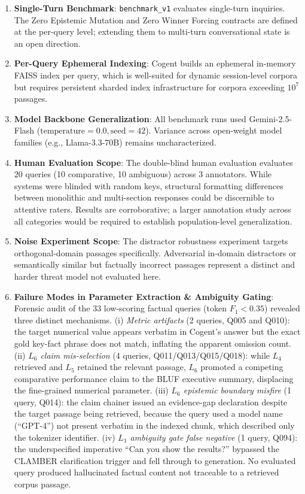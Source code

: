\documentclass[journal,compsoc]{IEEEtran}
\begin{document}
\begin{enumerate}
    \item \textbf{Single-Turn Benchmark}: \texttt{benchmark\_v1} evaluates single-turn inquiries. The Zero Epistemic Mutation and Zero Winner Forcing contracts are defined at the per-query level; extending them to multi-turn conversational state is an open direction.
    \item \textbf{Per-Query Ephemeral Indexing}: Cogent builds an ephemeral in-memory FAISS index per query, which is well-suited for dynamic session-level corpora but requires persistent sharded index infrastructure for corpora exceeding $10^7$ passages.
    \item \textbf{Model Backbone Generalization}: All benchmark runs used Gemini-2.5-Flash ($\text{temperature}=0.0, \text{seed}=42$). Variance across open-weight model families (e.g., Llama-3.3-70B) remains uncharacterized.
    \item \textbf{Human Evaluation Scope}: The double-blind human evaluation evaluates 20 queries (10 comparative, 10 ambiguous) across 3 annotators. While systems were blinded with random keys, structural formatting differences between monolithic and multi-section responses could be discernible to attentive raters. Results are corroborative; a larger annotation study across all categories would be required to establish population-level generalization.
    \item \textbf{Noise Experiment Scope}: The distractor robustness experiment targets orthogonal-domain passages specifically. Adversarial in-domain distractors or semantically similar but factually incorrect passages represent a distinct and harder threat model not evaluated here.
    \item \textbf{Failure Modes in Parameter Extraction \& Ambiguity Gating}: Forensic audit of the 33 low-scoring factual queries (token $F_1 < 0.35$) revealed three distinct mechanisms. (i) \emph{Metric artifacts} (2 queries, Q005 and Q010): the target numerical value appears verbatim in Cogent's answer but the exact gold key-fact phrase does not match, inflating the apparent omission count. (ii) \emph{$L_6$ claim mis-selection} (4 queries, Q011/Q013/Q015/Q018): while $L_4$ retrieved and $L_5$ retained the relevant passage, $L_6$ promoted a competing comparative performance claim to the BLUF executive summary, displacing the fine-grained numerical parameter. (iii) \emph{$L_6$ epistemic boundary misfire} (1 query, Q014): the claim chainer issued an evidence-gap declaration despite the target passage being retrieved, because the query used a model name (``GPT-4'') not present verbatim in the indexed chunk, which described only the tokenizer identifier. (iv) \emph{$L_1$ ambiguity gate false negative} (1 query, Q094): the underspecified imperative ``Can you show the results?'' bypassed the CLAMBER clarification trigger and fell through to generation. No evaluated query produced hallucinated factual content not traceable to a retrieved corpus passage.
\end{enumerate}
\end{document}
